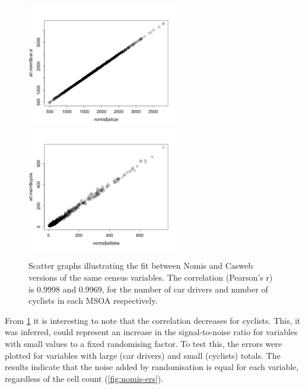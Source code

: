 \documentclass[a4paper, 11pt, twoside]{article}
\begin{document}
\begin{figure}[h]
 \centering
 \includegraphics[width=6.6cm]{nomis-vs-cens-car}
\includegraphics[width=6.6cm]{nomis-vs-cens-bike}
 \caption[Scatter plot of error introduced in Nomis data]{Scatter graphs
illustrating the fit between Nomis
and Casweb versions of the same census variables. The correlation (Pearson's r)
is 0.9998 and 0.9969, for the number of car drivers and number of cyclists in
each MSOA respectively.}
 \label{fig:nomis-vs-cens-car}
\end{figure}

From \cref{fig:nomis-vs-cens-car} it is interesting to note that the
correlation decreases for cyclists. This, it was inferred, could represent
an increase in the signal-to-noise ratio for variables with small values
to a fixed randomising factor.  To test this, the errors were plotted for
variables with large (car drivers) and small (cyclists) totals. The results
indicate that the noise added by randomisation is equal for each variable,
regardless of the cell count (\cref{fig:nomis-ers}).
\end{document}
